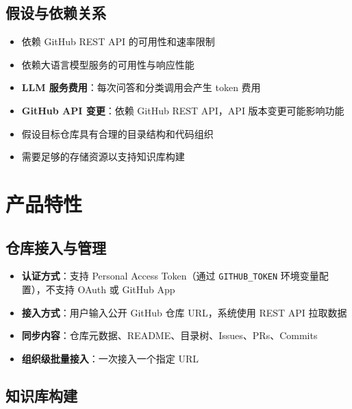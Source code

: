\documentclass[10pt,a4paper]{article}
\begin{document}
\subsection{假设与依赖关系}

\begin{itemize}
    \item 依赖 GitHub REST API 的可用性和速率限制
    \item 依赖大语言模型服务的可用性与响应性能
    \item \textbf{LLM 服务费用}：每次问答和分类调用会产生 token 费用
    \item \textbf{GitHub API 变更}：依赖 GitHub REST API，API 版本变更可能影响功能
    \item 假设目标仓库具有合理的目录结构和代码组织
    \item 需要足够的存储资源以支持知识库构建
\end{itemize}

\section{产品特性}

\subsection{仓库接入与管理}

\begin{itemize}
    \item \textbf{认证方式}：支持 Personal Access Token（通过 \texttt{GITHUB\_TOKEN} 环境变量配置），不支持 OAuth 或 GitHub App
    \item \textbf{接入方式}：用户输入公开 GitHub 仓库 URL，系统使用 REST API 拉取数据
    \item \textbf{同步内容}：仓库元数据、README、目录树、Issues、PRs、Commits
    \item \textbf{组织级批量接入}：一次接入一个指定 URL
\end{itemize}

\subsection{知识库构建}
\end{document}
